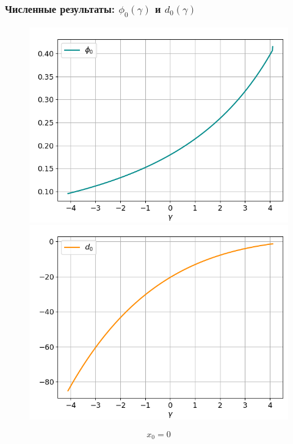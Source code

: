 \documentclass[fullscreen=true, unicode, bookmarks=false]{beamer}
\begin{document}
\begin{frame}
\frametitle{ Численные результаты: $ \phi_0(\gamma) $ и $ d_0(\gamma) $ }

\begin{figure} 
\includegraphics[scale=0.33]{oscillating_phi0_0.png}  
\hfill
\includegraphics[scale=0.33]{oscillating_d0_0.png}  
\end{figure}

$$ x_0 = 0 $$

\end{frame}
\end{document}
